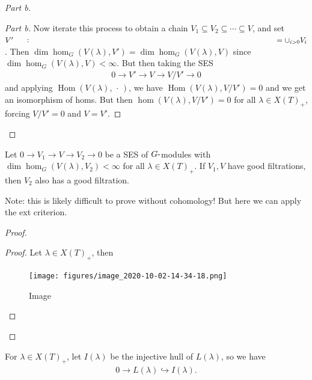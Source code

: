 \begin{proof}[Part b]
\begin{proof}[Part b]
Now iterate this process to obtain a chain
\(V_1 \subseteq V_2 \subseteq \cdots \subseteq V\), and set
\(V' \mathrel{\vcenter{:}}=\cup_{i>0} V_i\). Then
\(\dim \hom_G(V(\lambda), V') = \dim \hom_G( V(\lambda), V )\) since
\(\dim \hom_G(V(\lambda), V) < \infty\). But then taking the SES
\begin{align*}   0\to V' \to V \to V/V' \to 0 \end{align*} and applying
\({\operatorname{Hom}}(V(\lambda), {\,\cdot\,})\), we have
\({\operatorname{Hom}}(V(\lambda), V/V') = 0\) and we get an isomorphism
of homs. But then \(\hom(V(\lambda), V/V') = 0\) for all
\(\lambda \in X(T)_+\), forcing \(V/V'=0\) and \(V=V'\).

\end{proof}

\end{proof}

\begin{corollary}[?]

\begin{corollary}[?]

Let \(0\to V_1 \to V \to V_2 \to 0\) be a SES of \(G{\hbox{-}}\)modules
with \(\dim \hom_G(V(\lambda), V_2) < \infty\) for all
\(\lambda \in X(T)_+\). If \(V_1, V\) have good filtrations, then
\(V_2\) also has a good filtration.

\end{corollary}

\end{corollary}

Note: this is likely difficult to prove without cohomology! But here we
can apply the ext criterion.

\begin{proof}

\begin{proof}

Let \(\lambda \in X(T)_+\), then

\begin{figure}
\centering
\texttt{[image: figures/image\_2020-10-02-14-34-18.png]}
\caption{Image}
\end{figure}

\end{proof}

\end{proof}

For \(\lambda \in X(T)_+\), let \(I(\lambda)\) be the injective hull of
\(L(\lambda)\), so we have
\begin{align*}   0 \to L(\lambda) \hookrightarrow I(\lambda) .\end{align*}

